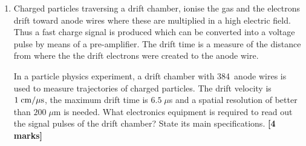 \begin{enumerate}
%
\hfill {\bf [2 marks]}\\

\item Charged particles traversing a drift chamber, ionise the gas and the electrons drift toward anode wires where these are multiplied in a high electric field. Thus a fast charge signal is produced which can be converted into a voltage pulse by means of a pre-amplifier. 
The drift time is a measure of the distance from where the the drift electrons were created to the anode wire.

In a particle physics experiment, a drift chamber with 384~anode wires is used to measure trajectories of charged particles. 
The drift velocity is $1\; {\rm cm/\mu s}$, the maximum drift time is $6.5 \; \mu$s
and  a spatial resolution of  better than $200\; \mu$m is needed.
What electronics equipment is required to read out the signal pulses of the drift chamber? State its main specifications.
\hfill {\bf [4 marks]}\\


\end{enumerate}

